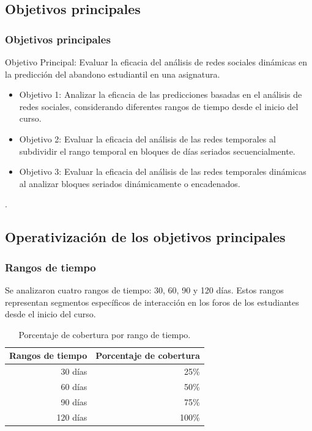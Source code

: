 \documentclass{beamer}
\begin{document}
\subsection{Objetivos principales}
\begin{frame}
	\frametitle{Objetivos principales}
	\begin{block}{Objetivo Principal: Evaluar la eficacia del análisis de redes sociales dinámicas en la predicción del abandono estudiantil en una asignatura.}
		\begin{itemize}

			\item  Objetivo 1: Analizar la eficacia de las predicciones basadas en el análisis de redes sociales, considerando diferentes rangos de tiempo desde el inicio del curso.
					
			\item  Objetivo 2: Evaluar la eficacia del análisis de las redes temporales al subdividir el rango temporal en bloques de días seriados secuencialmente.
			
			\item  	Objetivo 3: Evaluar la eficacia del análisis de las redes temporales dinámicas al analizar bloques seriados dinámicamente o encadenados.
					
		\end{itemize}. 
	\end{block}
\end{frame}

\subsection{Operativización de los objetivos principales}
\begin{frame}
	\frametitle{Rangos de tiempo}
	Se analizaron cuatro rangos de tiempo: 30, 60, 90 y 120 días. Estos rangos representan segmentos específicos de interacción en los foros de los estudiantes desde el inicio del curso. 
	\begin{table}[H]
		\centering
		\begin{tabular}{rr}
			\toprule
			Rangos de tiempo & Porcentaje de cobertura \\
			\midrule
			30 días & 25\% \\
			60 días & 50\% \\
			90 días & 75\% \\
			120 días & 100\% \\
			\bottomrule
		\end{tabular}
		\caption{Porcentaje de cobertura por rango de tiempo.}
		\label{tab:subdivision-porcentaje1}
	\end{table}
\end{frame}
\end{document}
